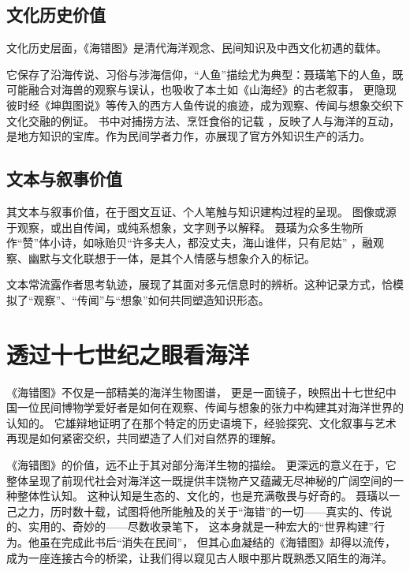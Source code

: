 \documentclass{source/Paper}
\begin{document}
\subsection{文化历史价值}
文化历史层面，《海错图》是清代海洋观念、民间知识及中西文化初遇的载体。

它保存了沿海传说、习俗与涉海信仰，“人鱼”描绘尤为典型：聂璜笔下的人鱼，既可能融合对海兽的观察与误认，也吸收了本土如《山海经》的古老叙事，
更隐现彼时经《坤舆图说》等传入的西方人鱼传说的痕迹，成为观察、传闻与想象交织下文化交融的例证。
书中对捕捞方法、烹饪食俗的记载 ，反映了人与海洋的互动，是地方知识的宝库。作为民间学者力作，亦展现了官方外知识生产的活力。

\subsection{文本与叙事价值}
其文本与叙事价值，在于图文互证、个人笔触与知识建构过程的呈现。
图像或源于观察，或出自传闻，或纯系想象，文字则予以解释。
聂璜为众多生物所作“赞”体小诗，如咏贻贝“许多夫人，都没丈夫，海山谁伴，只有尼姑” ，融观察、幽默与文化联想于一体，是其个人情感与想象介入的标记。

文本常流露作者思考轨迹，展现了其面对多元信息时的辨析。这种记录方式，恰模拟了“观察”、“传闻”与“想象”如何共同塑造知识形态。
\section{透过十七世纪之眼看海洋}
《海错图》不仅是一部精美的海洋生物图谱，
更是一面镜子，映照出十七世纪中国一位民间博物学爱好者是如何在观察、传闻与想象的张力中构建其对海洋世界的认知的。
它雄辩地证明了在那个特定的历史语境下，经验探究、文化叙事与艺术再现是如何紧密交织，共同塑造了人们对自然界的理解。

《海错图》的价值，远不止于其对部分海洋生物的描绘。
更深远的意义在于，它整体呈现了前现代社会对海洋这一既提供丰饶物产又蕴藏无尽神秘的广阔空间的一种整体性认知。
这种认知是生态的、文化的，也是充满敬畏与好奇的。
聂璜以一己之力，历时数十载，试图将他所能触及的关于“海错”的一切——真实的、传说的、实用的、奇妙的——尽数收录笔下，
这本身就是一种宏大的“世界构建”行为。他虽在完成此书后“消失在民间”，
但其心血凝结的《海错图》却得以流传，成为一座连接古今的桥梁，让我们得以窥见古人眼中那片既熟悉又陌生的海洋。
\end{document}
